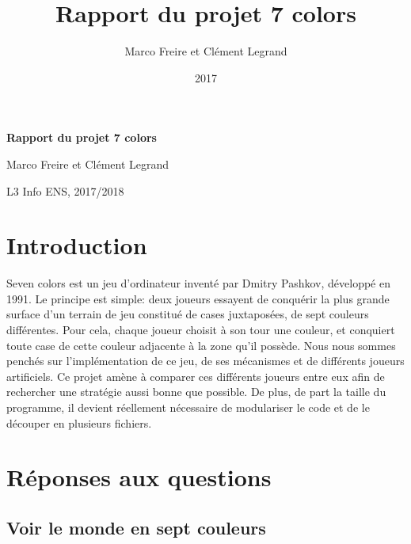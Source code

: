 \documentclass[12pt,a4paper,twoside]{article}
\author{Marco Freire et Clément Legrand}
\date{2017}
\title{Rapport du projet 7 colors}
\let\oldmaketitle=\maketitle
\def\maketitle{}
\begin{document}
\maketitle
\renewcommand{\v}[1]{\ensuremath{\overrightarrow{#1}}\xspace}
\let\oldcite=\cite
\def\cite#1{~\oldcite{#1}\xspace}
\let\oldref=\ref
\def\ref#1{~\oldref{#1}\xspace}
\let\oldeqref=\eqref
\def\eqref#1{~\oldeqref{#1}\xspace}
\let\leq=\leqslant
\let\geq=\geqslant
\let\le=\leqslant
\let\ge=\geqslant
\def\R{\ensuremath{\mathbb{R}}\xspace}
\pagestyle{empty} 
\let\maketitle=\oldmaketitle

\pagestyle{fancy}
\fancyhead{}
\fancyfoot{}
\lhead[\thepage]{\sffamily\itshape \leftmark}

\begin{center}
\bgroup\bf \LARGE Rapport du projet 7 colors\egroup\medskip

\large Marco Freire et Clément Legrand \smallskip

\normalsize L3 Info ENS, 2017/2018
\end{center}

\section{Introduction}
\label{sec:orgheadline1}
Seven colors est un jeu d'ordinateur inventé par Dmitry Pashkov,
développé en 1991. Le principe est simple: deux joueurs essayent de
conquérir la plus grande surface d'un terrain de jeu constitué de
cases juxtaposées, de sept couleurs différentes. Pour cela, chaque
joueur choisit à son tour une couleur, et conquiert toute case de
cette couleur adjacente à la zone qu'il possède.  Nous nous sommes
penchés sur l'implémentation de ce jeu, de ses mécanismes et de
différents joueurs artificiels. Ce projet amène à comparer ces
différents joueurs entre eux afin de rechercher une stratégie aussi
bonne que possible. De plus, de part la taille du programme, il
devient réellement nécessaire de modulariser le code et de le
découper en plusieurs fichiers.
\section{Réponses aux questions}
\label{sec:orgheadline25}
\subsection{Voir le monde en sept couleurs}
\label{sec:orgheadline9}
\end{document}
